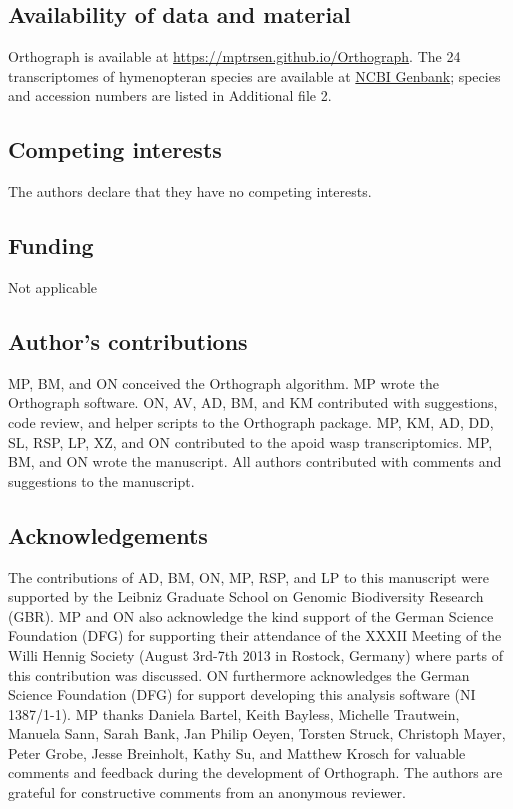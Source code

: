 \subsection{Availability of data and material}

Orthograph is available at \url{https://mptrsen.github.io/Orthograph}.
The 24 transcriptomes of hymenopteran species are available at
\href{http://www.ncbi.nlm.nih.gov/bioproject/?term=PRJNA183205}{NCBI
Genbank}; species and accession numbers are listed in Additional file 2.

\subsection{Competing interests}

The authors declare that they have no competing interests.

\subsection{Funding}

Not applicable

\subsection{Author's contributions}

MP, BM, and ON conceived the Orthograph algorithm. MP wrote the
Orthograph software. ON, AV, AD, BM, and KM contributed with
suggestions, code review, and helper scripts to the Orthograph package.
MP, KM, AD, DD, SL, RSP, LP, XZ, and ON contributed to the apoid wasp
transcriptomics. MP, BM, and ON wrote the manuscript. All authors
contributed with comments and suggestions to the manuscript.

\subsection{Acknowledgements}

The contributions of AD, BM, ON, MP, RSP, and LP to this manuscript were
supported by the Leibniz Graduate School on Genomic Biodiversity
Research (GBR).  MP and ON also acknowledge the kind support of the
German Science Foundation (DFG) for supporting their attendance of the
XXXII Meeting of the Willi Hennig Society (August 3rd-7th 2013 in
Rostock, Germany) where parts of this contribution was discussed.  ON
furthermore acknowledges the German Science Foundation (DFG) for support
developing this analysis software (NI 1387/1-1).  MP thanks Daniela
Bartel, Keith Bayless, Michelle Trautwein, Manuela Sann, Sarah Bank, Jan
Philip Oeyen, Torsten Struck, Christoph Mayer, Peter Grobe, Jesse
Breinholt, Kathy Su, and Matthew Krosch for valuable comments and
feedback during the development of Orthograph.  The authors are grateful
for constructive comments from an anonymous reviewer.
